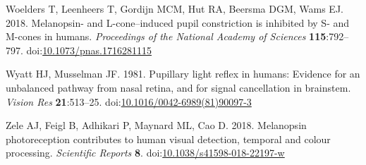 \documentclass[
]{article}
\begin{document}
\leavevmode\hypertarget{ref-Woelders2018}{}%
Woelders T, Leenheers T, Gordijn MCM, Hut RA, Beersma DGM, Wams EJ. 2018. Melanopsin- and L-cone--induced pupil constriction is inhibited by S- and M-cones in humans. \emph{Proceedings of the National Academy of Sciences} \textbf{115}:792--797. doi:\href{https://doi.org/10.1073/pnas.1716281115}{10.1073/pnas.1716281115}

\leavevmode\hypertarget{ref-Wyatt1981}{}%
Wyatt HJ, Musselman JF. 1981. Pupillary light reflex in humans: Evidence for an unbalanced pathway from nasal retina, and for signal cancellation in brainstem. \emph{Vision Res} \textbf{21}:513--25. doi:\href{https://doi.org/10.1016/0042-6989(81)90097-3}{10.1016/0042-6989(81)90097-3}

\leavevmode\hypertarget{ref-Zele2018}{}%
Zele AJ, Feigl B, Adhikari P, Maynard ML, Cao D. 2018. Melanopsin photoreception contributes to human visual detection, temporal and colour processing. \emph{Scientific Reports} \textbf{8}. doi:\href{https://doi.org/10.1038/s41598-018-22197-w}{10.1038/s41598-018-22197-w}
\end{document}
